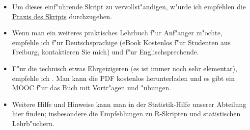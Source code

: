 \documentclass[a4paper,twoside]{tufte-book}\usepackage[]{graphicx}\usepackage[]{color}
\begin{document}
\begin{itemize}

\item Um dieses einf"uhrende Skript zu vervollst"andigen, w"urde ich empfehlen die \href{https://github.com/florianhartig/ResearchSkills/tree/master/Labs/Statistics}{Praxis des Skripts} durchzugehen.

\item Wenn man ein weiteres praktisches Lehrbuch f"ur Anf"anger m"ochte, empfehle ich \citet{Dormann-ParametrischeStatistik-2013} f"ur Deutschsprachige (eBook Kostenlos f"ur Studenten aus Freiburg, kontaktieren Sie mich) und \citet{Gotelli-PrimerEcologicalStatistics-2004} f"ur Englischsprechende. 

\item F"ur die technisch etwas Ehrgeizigeren (es ist immer noch sehr elementar), empfehle ich \citet{James-IntroductiontoStatistical-2013}. Man kann die PDF kostenlos herunterladen und es gibt ein MOOC f"ur das Buch mit Vortr"agen und "ubungen.

\item Weitere Hilfe und Hinweise kann man in der Statistik-Hilfe unserer Abteilung  \href{http://biometry.github.io/APES/}{hier} finden; insbesondere die Empfehlungen zu R-Skripten und statistischen Lehrb"uchern.

\end{itemize}






\end{document}
